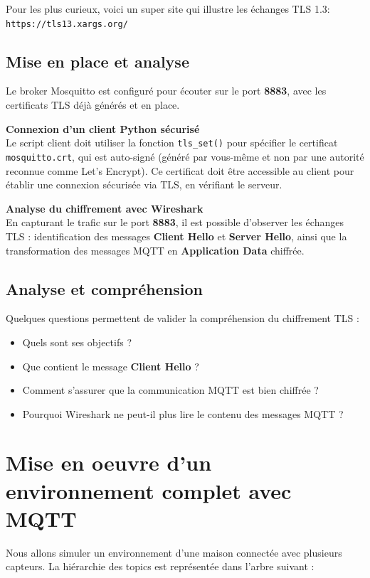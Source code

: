 \documentclass{article}
\begin{document}
Pour les plus curieux, voici un super site qui illustre les échanges TLS 1.3: \texttt{https://tls13.xargs.org/}

\subsection{Mise en place et analyse}

Le broker Mosquitto est configuré pour écouter sur le port \textbf{8883}, avec les certificats TLS déjà générés et en place.

\bigskip
\noindent
\textbf{Connexion d'un client Python sécurisé} \\
Le script client doit utiliser la fonction \texttt{tls\_set()} pour spécifier le certificat \texttt{mosquitto.crt}, qui est auto-signé (généré par vous-même et non par une autorité reconnue comme Let's Encrypt). Ce certificat doit être accessible au client pour établir une connexion sécurisée via TLS, en vérifiant le serveur.

\bigskip
\noindent
\textbf{Analyse du chiffrement avec Wireshark} \\
En capturant le trafic sur le port \textbf{8883}, il est possible d'observer les échanges TLS : identification des messages \textbf{Client Hello} et \textbf{Server Hello}, ainsi que la transformation des messages MQTT en \textbf{Application Data} chiffrée.

\subsection{Analyse et compréhension}

Quelques questions permettent de valider la compréhension du chiffrement TLS : \begin{itemize} \item Quels sont ses objectifs ? \item Que contient le message \textbf{Client Hello} ? \item Comment s’assurer que la communication MQTT est bien chiffrée ? \item Pourquoi Wireshark ne peut-il plus lire le contenu des messages MQTT ? \end{itemize}

\section{Mise en oeuvre d'un environnement complet avec MQTT}

Nous allons simuler un environnement d'une maison connectée avec plusieurs capteurs.
La hiérarchie des topics est représentée dans l'arbre suivant :
\end{document}
